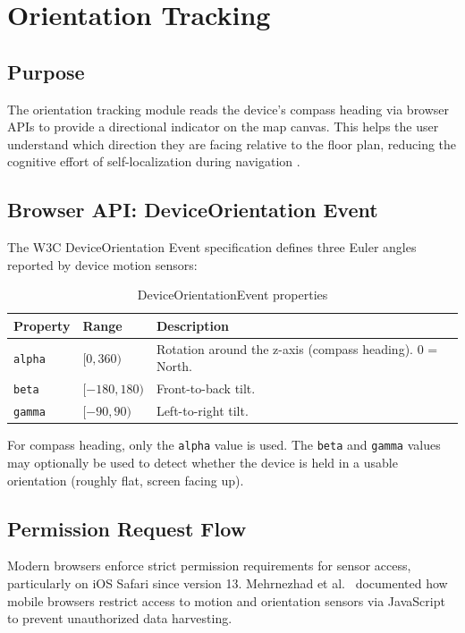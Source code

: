 \section{Orientation Tracking}
\label{sec:orientation-tracking}

\subsection{Purpose}

The orientation tracking module reads the device's compass heading via browser APIs to provide a directional indicator on the map canvas. This helps the user understand which direction they are facing relative to the floor plan, reducing the cognitive effort of self-localization during navigation \cite{DeCock2021}.

\subsection{Browser API: DeviceOrientation Event}

The W3C DeviceOrientation Event specification \cite{W3CDeviceOrientation2024} defines three Euler angles reported by device motion sensors:

\begin{table}[H]
\centering
\caption{DeviceOrientationEvent properties}
\begin{tabularx}{0.9\textwidth}{llX}
\toprule
\textbf{Property} & \textbf{Range} & \textbf{Description} \\
\midrule
\texttt{alpha} & $[0, 360)$ & Rotation around the z-axis (compass heading). 0 = North. \\
\texttt{beta}  & $[-180, 180)$ & Front-to-back tilt. \\
\texttt{gamma} & $[-90, 90)$ & Left-to-right tilt. \\
\bottomrule
\end{tabularx}
\end{table}

For compass heading, only the \texttt{alpha} value is used. The \texttt{beta} and \texttt{gamma} values may optionally be used to detect whether the device is held in a usable orientation (roughly flat, screen facing up).

\subsection{Permission Request Flow}

Modern browsers enforce strict permission requirements for sensor access, particularly on iOS Safari since version 13. Mehrnezhad et al.\ \cite{Mehrnezhad2016, Mehrnezhad2018} documented how mobile browsers restrict access to motion and orientation sensors via JavaScript to prevent unauthorized data harvesting.

